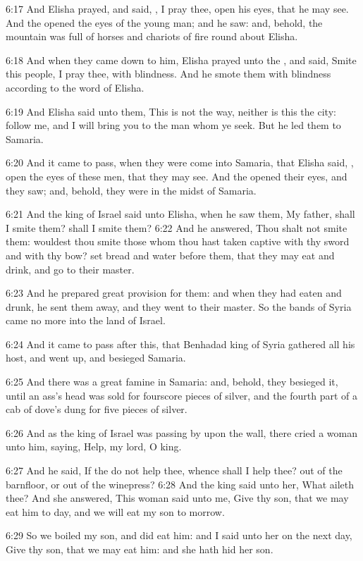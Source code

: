 6:17 And Elisha prayed, and said, \LORD, I pray thee, open his eyes,
that he may see. And the \LORD opened the eyes of the young man; and he
saw: and, behold, the mountain was full of horses and chariots of fire
round about Elisha.

6:18 And when they came down to him, Elisha prayed unto the \LORD, and
said, Smite this people, I pray thee, with blindness. And he smote
them with blindness according to the word of Elisha.

6:19 And Elisha said unto them, This is not the way, neither is this
the city: follow me, and I will bring you to the man whom ye seek. But
he led them to Samaria.

6:20 And it came to pass, when they were come into Samaria, that
Elisha said, \LORD, open the eyes of these men, that they may see. And
the \LORD opened their eyes, and they saw; and, behold, they were in
the midst of Samaria.

6:21 And the king of Israel said unto Elisha, when he saw them, My
father, shall I smite them? shall I smite them?  6:22 And he answered,
Thou shalt not smite them: wouldest thou smite those whom thou hast
taken captive with thy sword and with thy bow? set bread and water
before them, that they may eat and drink, and go to their master.

6:23 And he prepared great provision for them: and when they had eaten
and drunk, he sent them away, and they went to their master. So the
bands of Syria came no more into the land of Israel.

6:24 And it came to pass after this, that Benhadad king of Syria
gathered all his host, and went up, and besieged Samaria.

6:25 And there was a great famine in Samaria: and, behold, they
besieged it, until an ass's head was sold for fourscore pieces of
silver, and the fourth part of a cab of dove's dung for five pieces of
silver.

6:26 And as the king of Israel was passing by upon the wall, there
cried a woman unto him, saying, Help, my lord, O king.

6:27 And he said, If the \LORD do not help thee, whence shall I help
thee?  out of the barnfloor, or out of the winepress?  6:28 And the
king said unto her, What aileth thee? And she answered, This woman
said unto me, Give thy son, that we may eat him to day, and we will
eat my son to morrow.

6:29 So we boiled my son, and did eat him: and I said unto her on the
next day, Give thy son, that we may eat him: and she hath hid her son.

